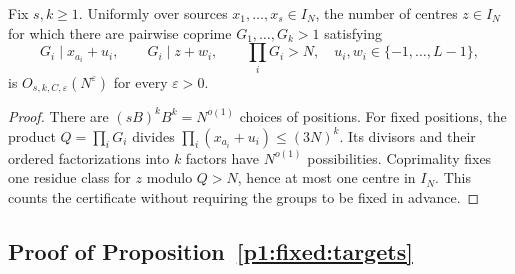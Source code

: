 \begin{lemma}
\label{p1:fixed:CRT}
Fix \(s,k\ge1\). Uniformly over sources
\(x_1,\ldots,x_s\in I_N\), the number of centres \(z\in I_N\)
for which there are pairwise coprime \(G_1,\ldots,G_k>1\)
satisfying
\[
 G_i\mid x_{a_i}+u_i,\qquad G_i\mid z+w_i,\qquad
 \prod_iG_i>N,
 \quad u_i,w_i\in\{-1,\ldots,L-1\},
\]
is \(O_{s,k,C,\varepsilon}(N^\varepsilon)\) for every
\(\varepsilon>0\).
\end{lemma}

\begin{proof}
There are \((sB)^kB^k=N^{o(1)}\) choices of positions.
For fixed positions, the product \(Q=\prod_iG_i\) divides
\(\prod_i(x_{a_i}+u_i)\le(3N)^k\). Its divisors and their
ordered factorizations into \(k\) factors have
\(N^{o(1)}\) possibilities. Coprimality fixes one residue
class for \(z\) modulo \(Q>N\), hence at most one centre
in \(I_N\). This counts the certificate without requiring
the groups to be fixed in advance.
\end{proof}

\subsection{Proof of Proposition~\ref{p1:fixed:targets}}
\label{p14:comp:fixed-targets}

